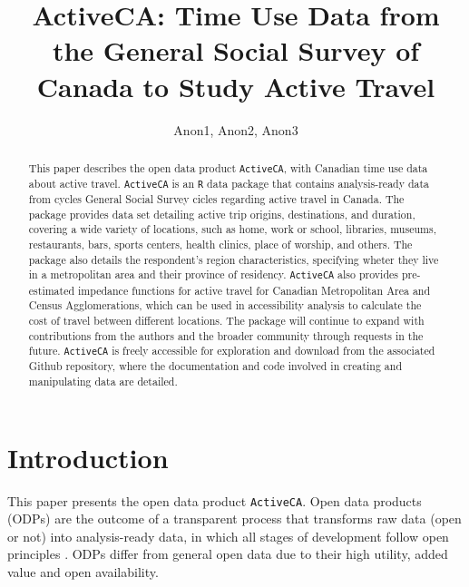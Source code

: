 \documentclass[Royal,times,sageh]{sagej}
\begin{document}

\title{ActiveCA: Time Use Data from the General Social Survey of Canada
to Study Active Travel}

\runninghead{}

\author{Anon1\affilnum{}, Anon2\affilnum{}, Anon3\affilnum{}}

\affiliation{\affilnum{}{}}



\begin{abstract}
This paper describes the open data product \texttt{ActiveCA}, with
Canadian time use data about active travel. \texttt{ActiveCA} is an
\texttt{R} data package that contains analysis-ready data from cycles
General Social Survey cicles regarding active travel in Canada. The
package provides data set detailing active trip origins, destinations,
and duration, covering a wide variety of locations, such as home, work
or school, libraries, museums, restaurants, bars, sports centers, health
clinics, place of worship, and others. The package also details the
respondent's region characteristics, specifying wheter they live in a
metropolitan area and their province of residency. \texttt{ActiveCA}
also provides pre-estimated impedance functions for active travel for
Canadian Metropolitan Area and Census Agglomerations, which can be used
in accessibility analysis to calculate the cost of travel between
different locations. The package will continue to expand with
contributions from the authors and the broader community through
requests in the future. \texttt{ActiveCA} is freely accessible for
exploration and download from the associated Github repository, where
the documentation and code involved in creating and manipulating data
are detailed.
\end{abstract}


\maketitle

\hypertarget{introduction}{%
\section{Introduction}\label{introduction}}

This paper presents the open data product \texttt{ActiveCA}. Open data
products (ODPs) are the outcome of a transparent process that transforms
raw data (open or not) into analysis-ready data, in which all stages of
development follow open principles \citep{arribas-bel2021}. ODPs differ
from general open data due to their high utility, added value and open
availability.
\end{document}
